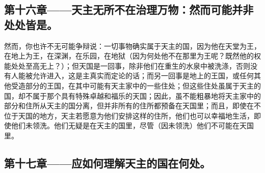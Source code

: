 
\subsection{第十六章——天主无所不在治理万物：然而可能并非处处皆是。}

然而，你也许不无可能争辩说：一切事物确实属于天主的国，因为他在天堂为王，在地上为王，在深渊，在乐园，在地狱（因为何处他不在那里为王呢？既然他的权能处处至高无上？）；但天国是一回事，除非他们在重生的水泉中被洗涤，否则没有人能被允许进入，这是主真实而定论的话；而另一回事是地上的王国，或任何其他受造部分的王国，在其中可能有天主家中的一些住处；但这些住处虽属于天主的国，却不属于那个具有特殊卓越和福乐的天国；因此，虽不能粗暴地将天主家中的部分和住所从天主的国分离，但并非所有的住所都预备在天国里；而且，即使在不位于天国的地方，天主若愿意为他们安排这样的住所，他们也可以幸福地生活，即使他们未领洗。他们无疑是在天主的国里，尽管（因未领洗）他们不可能在天国里。\par


\subsection{第十七章——应如何理解天主的国在何处。}

